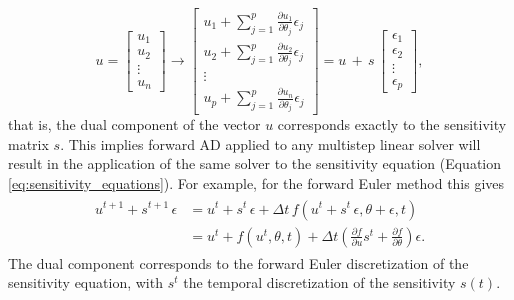 \begin{equation}
    u =
    \begin{bmatrix}
    u_1 \\
    u_2 \\
    \vdots \\
    u_n
    \end{bmatrix}
    \longrightarrow
    \begin{bmatrix}
    u_1 + \sum_{j=1}^p \frac{\partial u_1}{\partial \theta_j} \epsilon_j \\
    u_2 + \sum_{j=1}^p \frac{\partial u_2}{\partial \theta_j} \epsilon_j \\
    \vdots \\
    u_p + \sum_{j=1}^p \frac{\partial u_n}{\partial \theta_j} \epsilon_j
    \end{bmatrix}
    = 
    u \, + \, s \, 
    \begin{bmatrix}
    \epsilon_1 \\
    \epsilon_2 \\
    \vdots \\
    \epsilon_p
    \end{bmatrix},
\end{equation}
that is, the dual component of the vector $u$ corresponds exactly to the sensitivity matrix $s$. 
This implies forward AD applied to any multistep linear solver will result in the application of the same solver to the sensitivity equation (Equation \eqref{eq:sensitivity_equations}).  
For example, for the forward Euler method this gives 
\begin{align}
\begin{split}
    u^{t+1} + s^{t+1} \, \epsilon 
    &= 
    u^t +  s^t \, \epsilon + \Delta t \, f (u^t + s^t \, \epsilon, \theta + \epsilon, t) \\
    &= 
    u^t + f(u^t, \theta, t) 
    + 
    \Delta t 
    \left( 
    \frac{\partial f}{\partial u} s^t + 
    \frac{\partial f}{\partial \theta}
    \right) \epsilon.
\end{split}
\label{eq:sensitivity-equation-AD}
\end{align}
The dual component corresponds to the forward Euler discretization of the sensitivity equation, with $s^t$ the temporal discretization of the sensitivity $s(t)$.

